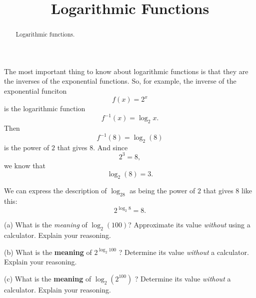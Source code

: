 \documentclass{ximera}
\title{Logarithmic Functions}
\begin{document}
\begin{abstract}
Logarithmic functions.
\end{abstract}
\maketitle


The most important thing to know about logarithmic functions is that they are the inverses of the exponential functions. So, for example, the inverse of the exponential funciton
\[
    f(x) = 2^x
\]
is the logarithmic function 
\[
   f^{-1}(x) = \log_2 x.
\]
Then 
\[
    f^{-1}(8) = \log_2 (8)    
\]
is the power of $2$ that gives $8$. And since
\[
   2^3 = 8 ,
\]
we know that
\[
   \log_2(8) = 3 .
\]

We can express the description of $\log_28$ as being the power of $2$ that gives $8$ like this:
\[
   2^{\log_2 8} = 8.
\]

\begin{question}    \label{Ex0:LogF}
(a) What is the \emph{meaning} of $\log_2(100)$? Approximate its value \emph{without} using a calculator. Explain your reasoning.

(b) What is the {\bf meaning} of $2^{\log_2 100}$ ? Determine its value \emph{without} a calculator. Explain your reasoning.

(c) What is the {\bf meaning} of $\log_2 (2^{100})$ ? Determine its value \emph{without} a calculator. Explain your reasoning.

\end{question}
\end{document}
